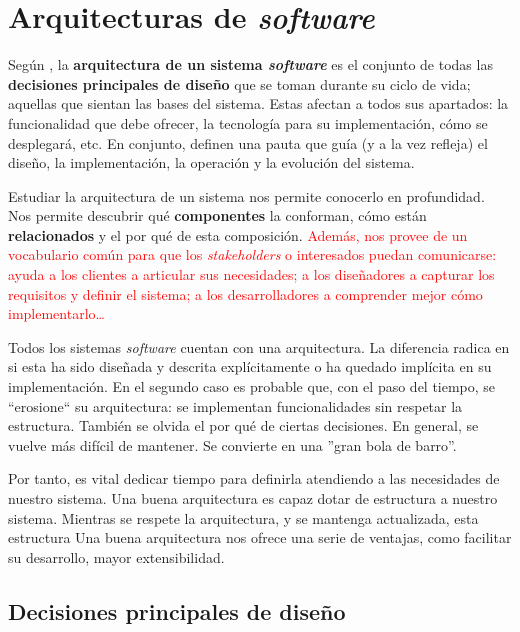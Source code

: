 
\section{Arquitecturas de \emph{software}}

Según \cite{taylorSoftwareArchitectureFoundations2009}, la \textbf{arquitectura de un sistema \emph{software}} es el conjunto de todas las \textbf{decisiones principales de diseño} que se toman durante su ciclo de vida; aquellas que sientan las bases del sistema. Estas afectan a todos sus apartados: la funcionalidad que debe ofrecer, la tecnología para su implementación, cómo se desplegará, etc. En conjunto, definen una pauta que guía (y a la vez refleja) el diseño, la implementación, la operación y la evolución del sistema.

Estudiar la arquitectura de un sistema nos permite conocerlo en profundidad. Nos permite descubrir qué \textbf{componentes} la conforman, cómo están \textbf{relacionados} y el por qué de esta composición. \cite{perryFoundationsStudySoftware1992} \textcolor{red}{Además, nos provee de un vocabulario común para que los \emph{stakeholders} o interesados puedan comunicarse: ayuda a los clientes a articular sus necesidades; a los diseñadores a capturar los requisitos y definir el sistema; a los desarrolladores a comprender mejor cómo implementarlo\dots}

Todos los sistemas \emph{software} cuentan con una arquitectura. La diferencia radica en si esta ha sido diseñada y descrita explícitamente o ha quedado implícita en su implementación. \cite{taylorSoftwareArchitectureFoundations2009} En el segundo caso es probable que, con el paso del tiempo, se ``erosione`` su arquitectura: se implementan funcionalidades sin respetar la estructura. También se olvida el por qué de ciertas decisiones. En general, se vuelve más difícil de mantener. Se convierte en una ''gran bola de barro''. \cite{footeBigBallMud1997}

Por tanto, es vital dedicar tiempo para definirla atendiendo a las necesidades de nuestro sistema. Una buena arquitectura es capaz dotar de estructura a nuestro sistema. \cite{martinCleanArchitectureCraftsman2018} Mientras se respete la arquitectura, y se mantenga actualizada, esta estructura Una buena arquitectura nos ofrece una serie de ventajas, como facilitar su desarrollo, mayor extensibilidad.

\subsection{Decisiones principales de diseño}


